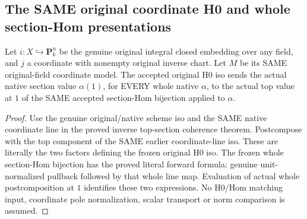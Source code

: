 \subsection{The SAME original coordinate H0 and whole section-Hom presentations}
\begin{theorem}
\label{thm:seven-original-coordinate-h0-hom-values}
\leanok
Let $i:X\hookrightarrow\mathbf P^n_k$ be the genuine original integral
closed embedding over any field, and $j$ a coordinate with nonempty
original inverse chart. Let $M$ be its SAME original-field coordinate
model. The accepted original H0 iso sends the actual native section
value $\alpha(1)$, for EVERY whole native $\alpha$, to the actual top
value at $1$ of the SAME accepted section-Hom bijection applied to $\alpha$.
\end{theorem}
\begin{proof}
Use the genuine original/native scheme iso and the SAME native
coordinate line in the proved inverse top-section coherence theorem.
Postcompose with the top component of the SAME earlier coordinate-line
iso. These are literally the two factors defining the frozen original
H0 iso. The frozen whole section-Hom bijection has the proved literal
forward formula: genuine unit-normalized pullback followed by that
whole line map. Evaluation of actual whole postcomposition at $1$
identifies these two expressions. No H0/Hom matching input, coordinate
pole normalization, scalar transport or norm comparison is assumed.
\end{proof}
